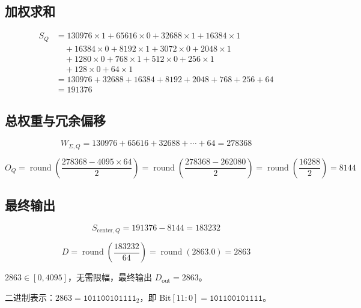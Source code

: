 \documentclass[
  UTF8,
  a4paper,
  11pt,
  oneside,
  fontset=fandol
]{ctexrep}
\newcommand{\round}{\operatorname{round}}
\newcommand{\Dout}{D_{\mathrm{out}}}
\newcommand{\roundop}[1]{\round\!\left(#1\right)}
\begin{document}
\subsection{加权求和}

\begin{equation}
\begin{aligned}
S_Q &= 130976{\times}1 + 65616{\times}0 + 32688{\times}1 + 16384{\times}1 \\
&\quad + 16384{\times}0 + 8192{\times}1 + 3072{\times}0 + 2048{\times}1 \\
&\quad + 1280{\times}0 + 768{\times}1 + 512{\times}0 + 256{\times}1 \\
&\quad + 128{\times}0 + 64{\times}1 \\
&= 130976 + 32688 + 16384 + 8192 + 2048 + 768 + 256 + 64 \\
&= 191376
\end{aligned}
\end{equation}

\subsection{总权重与冗余偏移}

\begin{equation}
W_{\Sigma,Q} = 130976 + 65616 + 32688 + \cdots + 64 = 278368
\end{equation}

\begin{equation}
O_Q = \roundop{\frac{278368 - 4095 \times 64}{2}} = \roundop{\frac{278368 - 262080}{2}} = \roundop{\frac{16288}{2}} = 8144
\end{equation}

\subsection{最终输出}

\begin{equation}
S_{\mathrm{center},Q} = 191376 - 8144 = 183232
\end{equation}

\begin{equation}
D = \roundop{\frac{183232}{64}} = \roundop{2863.0} = 2863
\end{equation}

$2863 \in [0, 4095]$，无需限幅，最终输出 $\Dout = 2863$。

二进制表示：$2863 = \texttt{101100101111}_2$，即 Bit$[11:0] = \texttt{101100101111}$。
\end{document}
